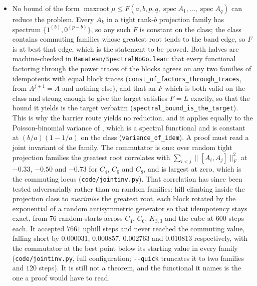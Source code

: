 \documentclass[11pt]{article}
\theoremstyle{remark}
\begin{document}
\begin{itemize}
\item No bound of the form $\operatorname{maxroot}\mu\le F(a,b,p,q,\operatorname{spec}A_1,\dots,
  \operatorname{spec}A_q)$ can reduce the problem. Every $A_k$ in a tight rank-$b$ projection
  family has spectrum $\{1^{(b)},0^{(p-b)}\}$, so any such $F$ is constant on the class; the class
  contains commuting families whose greatest root tends to the band edge, so $F$ is at best that
  edge, which is the statement to be proved. Both halves are machine-checked in
  \texttt{RamaLean/SpectralNoGo.lean}: that every functional factoring through the power traces of
  the blocks agrees on any two families of idempotents with equal block traces
  (\texttt{const\_of\_factors\_through\_traces}, from $A^{j+1}=A$ and nothing else), and that an $F$
  which is both valid on the class and strong enough to give the target satisfies $F=L$ exactly, so
  that the bound it yields is the target verbatim (\texttt{spectral\_bound\_is\_the\_target}). This
  is why the barrier route yields no reduction, and
  it applies equally to the Poisson-binomial variance of \cite{Supp2}, which is a spectral
  functional and is constant at $(b/a)(1-1/a)$ on the class
  (\texttt{variance\_of\_idem}). A proof must read a joint invariant of
  the family. The commutator is one: over random tight projection families the greatest root
  correlates with $\sum_{i<j}\|[A_i,A_j]\|_F^2$ at $-0.33$, $-0.50$ and $-0.73$ for $C_4$, $C_6$
  and $C_8$, and is largest at zero, which is the commuting locus
  (\texttt{code/jointinv.py}). That correlation has since been tested adversarially rather than on
  random families: hill climbing inside the projection class to \emph{maximise} the greatest root,
  each block rotated by the exponential of a random antisymmetric generator so that idempotency
  stays exact, from $76$ random starts across $C_4$, $C_6$, $K_{3,3}$ and the cube at $600$ steps
  each. It accepted $7661$ uphill steps and never reached the commuting value, falling short by
  $0.000031$, $0.000857$, $0.002763$ and $0.010813$ respectively, with the commutator at the best
  point below its starting value in every family (\texttt{code/jointinv.py}, full configuration;
  \texttt{-{}-quick} truncates it to two families and $120$ steps). It is still not a theorem, and
  the functional it names is the one a proof would have to read.


\end{itemize}
\end{document}
